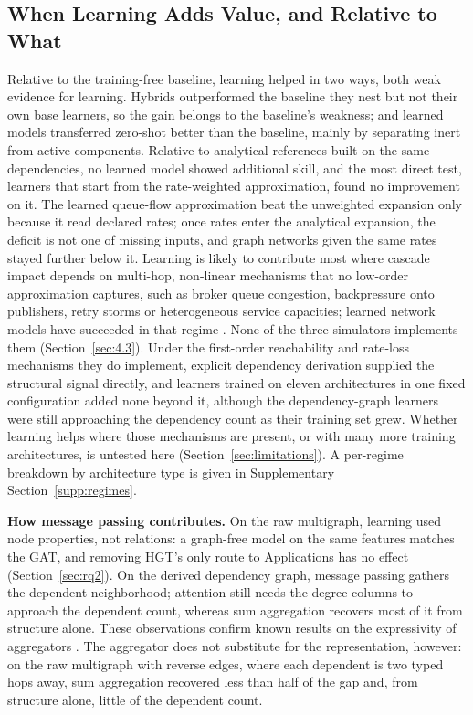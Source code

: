 \subsection{When Learning Adds Value, and Relative to What}
\label{sec:8.2}

Relative to the training-free baseline, learning helped in two ways, both weak evidence for learning. Hybrids outperformed the baseline they nest but not their own base learners, so the gain belongs to the baseline's weakness; and learned models transferred zero-shot better than the baseline, mainly by separating inert from active components. Relative to analytical references built on the same dependencies, no learned model showed additional skill, and the most direct test, learners that start from the rate-weighted approximation, found no improvement on it. The learned queue-flow approximation beat the unweighted expansion only because it read declared rates; once rates enter the analytical expansion, the deficit is not one of missing inputs, and graph networks given the same rates stayed further below it. Learning is likely to contribute most where cascade impact depends on multi-hop, non-linear mechanisms that no low-order approximation captures, such as broker queue congestion, backpressure onto publishers, retry storms or heterogeneous service capacities; learned network models have succeeded in that regime \cite{rusek2020routenet}. None of the three simulators implements them (Section~\ref{sec:4.3}). Under the first-order reachability and rate-loss mechanisms they do implement, explicit dependency derivation supplied the structural signal directly, and learners trained on eleven architectures in one fixed configuration added none beyond it, although the dependency-graph learners were still approaching the dependency count as their training set grew. Whether learning helps where those mechanisms are present, or with many more training architectures, is untested here (Section~\ref{sec:limitations}). A per-regime breakdown by architecture type is given in Supplementary Section~\ref{supp:regimes}.

\noindent\textbf{How message passing contributes.} On the raw multigraph, learning used node properties, not relations: a graph-free model on the same features matches the GAT, and removing HGT's only route to Applications has no effect (Section~\ref{sec:rq2}). On the derived dependency graph, message passing gathers the dependent neighborhood; attention still needs the degree columns to approach the dependent count, whereas sum aggregation recovers most of it from structure alone. These observations confirm known results on the expressivity of aggregators \cite{xu2019gin,corso2020pna,chen2020can}. The aggregator does not substitute for the representation, however: on the raw multigraph with reverse edges, where each dependent is two typed hops away, sum aggregation recovered less than half of the gap and, from structure alone, little of the dependent count.

